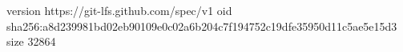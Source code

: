 version https://git-lfs.github.com/spec/v1
oid sha256:a8d239981bd02eb90109e0c02a6b204c7f194752c19dfe35950d11c5ae5e15d3
size 32864
